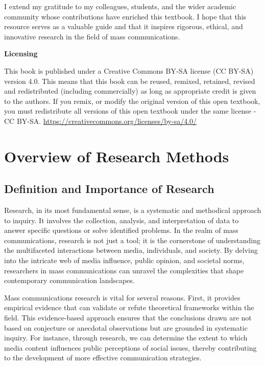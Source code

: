 \documentclass[
]{book}
\begin{document}
I extend my gratitude to my colleagues, students, and the wider academic community whose contributions have enriched this textbook. I hope that this resource serves as a valuable guide and that it inspires rigorous, ethical, and innovative research in the field of mass communications.

\textbf{Licensing}

This book is published under a Creative Commons BY-SA license (CC BY-SA) version 4.0. This means that this book can be reused, remixed, retained, revised and redistributed (including commercially) as long as appropriate credit is given to the authors. If you remix, or modify the original version of this open textbook, you must redistribute all versions of this open textbook under the same license - CC BY-SA. \url{https://creativecommons.org/licenses/by-sa/4.0/}

\chapter{Overview of Research Methods}\label{overview-of-research-methods}

\section{Definition and Importance of Research}\label{definition-and-importance-of-research}

Research, in its most fundamental sense, is a systematic and methodical approach to inquiry. It involves the collection, analysis, and interpretation of data to answer specific questions or solve identified problems. In the realm of mass communications, research is not just a tool; it is the cornerstone of understanding the multifaceted interactions between media, individuals, and society. By delving into the intricate web of media influence, public opinion, and societal norms, researchers in mass communications can unravel the complexities that shape contemporary communication landscapes.

Mass communications research is vital for several reasons. First, it provides empirical evidence that can validate or refute theoretical frameworks within the field. This evidence-based approach ensures that the conclusions drawn are not based on conjecture or anecdotal observations but are grounded in systematic inquiry. For instance, through research, we can determine the extent to which media content influences public perceptions of social issues, thereby contributing to the development of more effective communication strategies.
\end{document}
